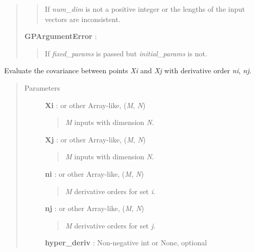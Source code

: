 \documentclass[letterpaper,10pt,english]{sphinxmanual}
\begin{document}
\begin{fulllineitems}
\begin{quote}
\begin{description}
\begin{quote}
If \emph{num\_dim} is not a positive integer or the lengths of
the input vectors are inconsistent.
\end{quote}

\textbf{GPArgumentError} :
\begin{quote}

If \emph{fixed\_params} is passed but \emph{initial\_params} is not.
\end{quote}

\end{description}\end{quote}

\begin{fulllineitems}
\label{gptools.kernel:gptools.kernel.squared_exponential.SquaredExponentialKernel.__call__}
Evaluate the covariance between points \emph{Xi} and \emph{Xj} with derivative order \emph{ni}, \emph{nj}.
\begin{quote}\begin{description}
\item[{Parameters }] \leavevmode
\textbf{Xi} :  or other Array-like, (\emph{M}, \emph{N})
\begin{quote}

\emph{M} inputs with dimension \emph{N}.
\end{quote}

\textbf{Xj} :  or other Array-like, (\emph{M}, \emph{N})
\begin{quote}

\emph{M} inputs with dimension \emph{N}.
\end{quote}

\textbf{ni} :  or other Array-like, (\emph{M}, \emph{N})
\begin{quote}

\emph{M} derivative orders for set \emph{i}.
\end{quote}

\textbf{nj} :  or other Array-like, (\emph{M}, \emph{N})
\begin{quote}

\emph{M} derivative orders for set \emph{j}.
\end{quote}

\textbf{hyper\_deriv} : Non-negative int or None, optional
\begin{quote}


\end{quote}
\end{description}
\end{quote}
\end{fulllineitems}
\end{fulllineitems}
\end{document}
